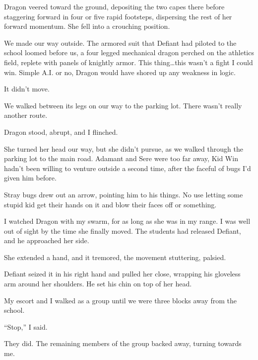 Dragon veered toward the ground, depositing the two capes there before staggering forward in four or five rapid footsteps, dispersing the rest of her forward momentum.  She fell into a crouching position.



We made our way outside.  The armored suit that Defiant had piloted to the school loomed before us, a four legged mechanical dragon perched on the athletics field, replete with panels of knightly armor.  This thing\ldots this wasn't a fight I could win.  Simple A.I. or no, Dragon would have shored up any weakness in logic.



It didn't move.



We walked between its legs on our way to the parking lot.  There wasn't really another route.



Dragon stood, abrupt, and I flinched.



She turned her head our way, but she didn't pursue, as we walked through the parking lot to the main road.  Adamant and Sere were too far away, Kid Win hadn't been willing to venture outside a second time, after the faceful of bugs I'd given him before.



Stray bugs drew out an arrow, pointing him to his things.  No use letting some stupid kid get their hands on it and blow their faces off or something.



I watched Dragon with my swarm, for as long as she was in my range.  I was well out of sight by the time she finally moved.  The students had released Defiant, and he approached her side.



She extended a hand, and it tremored, the movement stuttering, palsied.



Defiant seized it in his right hand and pulled her close, wrapping his gloveless arm around her shoulders.  He set his chin on top of her head.



My escort and I walked as a group until we were three blocks away from the school.



``Stop,'' I said.



They did.  The remaining members of the group backed away, turning towards me.



